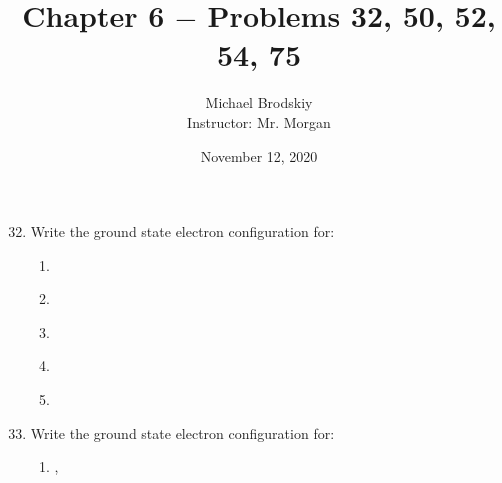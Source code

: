 \documentclass[12pt]{article}
\title{Chapter 6 $-$ Problems 32, 50, 52, 54, 75}
\date{November 12, 2020}
\author{Michael Brodskiy\\ \small Instructor: Mr. Morgan}
\begin{document}
\maketitle

\begin{enumerate}

    \setcounter{enumi}{31}

  \item Write the ground state electron configuration for:

    \begin{enumerate}

      \item {}

        \begin{center}
        \end{center}

      \item {}

        \begin{center}
        \end{center}

      \item {}

        \begin{center}
        \end{center}

      \item {}

        \begin{center}
        \end{center}

      \item {}

        \begin{center}
        \end{center}

    \end{enumerate}

    \setcounter{enumi}{49}

  \item Write the ground state electron configuration for:

    \begin{enumerate}

      \item {}, 


\end{enumerate}
\end{enumerate}
\end{document}

